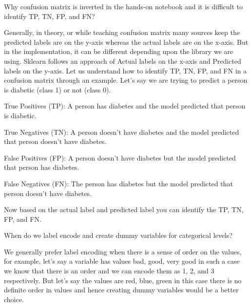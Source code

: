    \begin{qanda}
		\begin{question}
Why confusion matrix is inverted in the hands-on notebook and it is difficult to identify TP, TN, FP, and FN?
		\end{question}

		\begin{answer}
Generally, in theory, or while teaching confusion matrix many sources keep the predicted labels are on the y-axis whereas the actual labels are on the x-axis. But in the implementation, it can be different depending upon the library we are using.  Sklearn follows an approach of Actual labels on the x-axis and Predicted labels on the y-axis.  Let us understand how to identify TP, TN, FP, and FN in a confusion matrix through an example.  Let's say we are trying to predict a person is diabetic (class 1) or not (class 0).
	\begin{bulletedlist}
		\item True Positives (TP): A person has diabetes and the model predicted that person is diabetic.
		\item True Negatives (TN): A person doesn't have diabetes and the model predicted that person doesn't have diabetes.
		\item False Positives (FP): A person doesn't have diabetes but the model predicted that person has diabetes.
		\item False Negatives (FN): The person has diabetes but the model predicted that person doesn't have diabetes.
	\end{bulletedlist}
Now based on the actual label and predicted label you can identify the TP, TN, FP, and FN.
		\end{answer}
    \end{qanda}




    \begin{qanda}
		\begin{question}
When do we label encode and create dummy variables for categorical levels?
		\end{question}

		\begin{answer}
We generally prefer label encoding when there is a sense of order on the values, for example, let's say a variable has values bad, good, very good in such a case we know that there is an order and we can encode them as 1, 2, and 3 respectively.  But let's say the values are red, blue, green in this case there is no definite order in values and hence creating dummy variables would be a better choice.
		\end{answer}
    \end{qanda}

